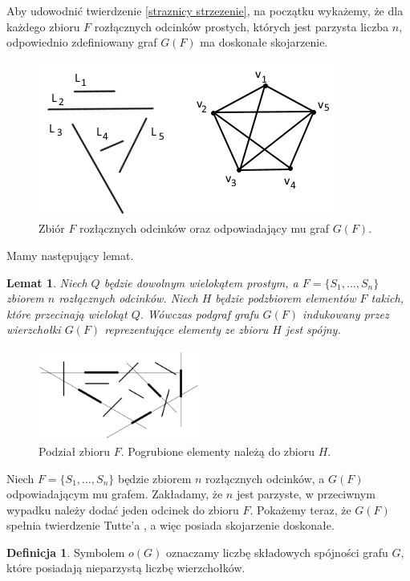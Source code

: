 \documentclass[brudnopis]{xmgr}
\newtheorem{Lemat}{Lemat}
\theoremstyle{definition}
\newtheorem{Definicja}{Definicja}
\begin{document}
Aby udowodnić twierdzenie \ref{straznicy strzezenie}, na początku wykażemy, że dla każdego zbioru $F$ rozłącznych odcinków prostych, których jest parzysta liczba $n$, odpowiednio zdefiniowany graf $G(F)$ ma doskonałe skojarzenie.

\begin{figure}[ht!]
 \centering
  \includegraphics{rysunki/g_f.png}
  \caption{Zbiór $F$ rozłącznych odcinków oraz odpowiadający mu graf $G(F)$.}
  \label{fig:zbior odcinkow rozlacznych}
\end{figure} 

Mamy następujący lemat.
\begin{Lemat}\label{podgraf indukowany} \cite{illumination}
Niech $Q$ będzie dowolnym wielokątem prostym, a $F = \{S_1,\ldots,S_n\}$ zbiorem $n$ rozłącznych odcinków. Niech $H$ będzie podzbiorem elementów $F$ takich, które przecinają wielokąt $Q$. Wówczas podgraf grafu $G(F)$ indukowany przez wierzchołki $G(F)$ reprezentujące elementy ze zbioru $H$ jest spójny.
\end{Lemat}
\begin{figure}[ht!]
 \centering
  \includegraphics[height=3cm]{rysunki/podzial_h.png}
  \caption{Podział zbioru $F$. Pogrubione elementy należą do zbioru $H$.}
\end{figure} 
Niech $F = \{S_1,\ldots,S_n\}$ będzie zbiorem $n$ rozłącznych odcinków, a $G(F)$ odpowiadającym mu grafem. Zakładamy, że $n$ jest parzyste, w przeciwnym wypadku należy dodać jeden odcinek do zbioru $F$. Pokażemy teraz, że $G(F)$ spełnia twierdzenie Tutte'a \cite{tutte}, a więc posiada skojarzenie doskonałe.
\begin{Definicja}
	Symbolem $o(G)$ oznaczamy liczbę składowych spójności grafu $G$, które posiadają nieparzystą liczbę wierzchołków.
\end{Definicja}
\end{document}
